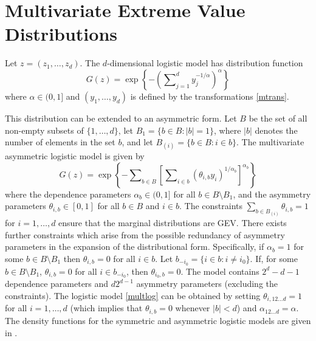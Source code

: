 \documentclass[11pt,a4paper]{article}
\begin{document}
\section{Multivariate Extreme Value Distributions}
\setcounter{footnote}{0}
\label{mult}

Let $z=(z_1,\dots,z_d)$.
The $d$-dimensional logistic model \citep{gumb60b} has distribution function
\begin{equation}
G(z) = \exp\left\{-\left(\sum\nolimits_{j=1}^d y_j^{-1/\alpha}\right)^\alpha\right\}
\label{multlog}
\end{equation} 
where $\alpha\in(0,1]$ and $(y_1,\dots,y_d)$ is defined by the transformations \eqref{mtrans}.

This distribution can be extended to an asymmetric form. 
Let $B$ be the set of all non-empty subsets of $\{1,\dots,d\}$, let $B_1=\{b \in B:|b|=1\}$, where $|b|$ denotes the number of elements in the set $b$,  and let $B_{(i)}=\{b \in B:i \in b\}$.
The multivariate asymmetric logistic model \citep{tawn90} is given by
\begin{equation*}
G(z)=\exp\left\{-\sum\nolimits_{b \in B} \left[\sum\nolimits_{i \in b}(\theta_{i,b}y_i)^{1/\alpha_b}\right]^{\alpha_b}\right\}
\label{multalog}
\end{equation*} 
where the dependence parameters $\alpha_b\in(0,1]$ for all $b\in B \setminus B_1$, and the asymmetry parameters $\theta_{i,b}\in[0,1]$ for all $b\in B$ and $i\in b$.
The constraints $\sum_{b \in B_{(i)}}\theta_{i,b}=1$ for $i=1,\dots,d$ ensure that the marginal distributions are GEV.
There exists further constraints which arise from the possible redundancy of asymmetry parameters in the expansion of the distributional form.
Specifically, if $\alpha_b=1$ for some $b\in B \setminus B_1$ then $\theta_{i,b}=0$ for all $i \in b$.
Let $b_{-i_0}=\{i \in b:i \neq i_0\}$.
If, for some $b \in B \setminus B_1$, $\theta_{i,b}=0$ for all $i \in b_{-i_0}$, then $\theta_{i_0,b}=0$.
The model contains $2^d-d-1$ dependence parameters and $d2^{d-1}$ asymmetry parameters (excluding the constraints).
The logistic model \eqref{multlog} can be obtained by setting $\theta_{i,12 \dots d}=1$ for all $i = 1,\dots,d$ (which implies that $\theta_{i,b}=0$ whenever $|b|<d$) and $\alpha_{12 \dots d} = \alpha$.
The density functions for the symmetric and asymmetric logistic models are given in \citet{step:phd}.
\end{document}
